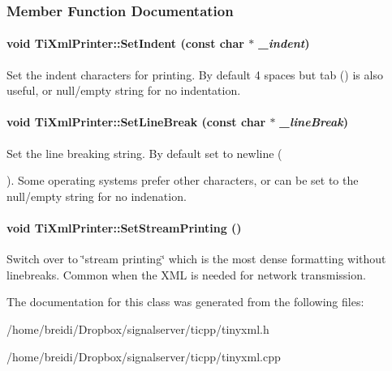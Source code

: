 \subsubsection{Member Function Documentation}
\hypertarget{class_ti_xml_printer_a213377a4070c7e625bae59716b089e5e}{
\paragraph[{SetIndent}]{\setlength{\rightskip}{0pt plus 5cm}void TiXmlPrinter::SetIndent (const char $\ast$ {\em \_\-indent})}\hfill}
\label{class_ti_xml_printer_a213377a4070c7e625bae59716b089e5e}
Set the indent characters for printing. By default 4 spaces but tab () is also useful, or null/empty string for no indentation. \hypertarget{class_ti_xml_printer_a4be1e37e69e3858c59635aa947174fe6}{
\paragraph[{SetLineBreak}]{\setlength{\rightskip}{0pt plus 5cm}void TiXmlPrinter::SetLineBreak (const char $\ast$ {\em \_\-lineBreak})}\hfill}
\label{class_ti_xml_printer_a4be1e37e69e3858c59635aa947174fe6}
Set the line breaking string. By default set to newline (\par
). Some operating systems prefer other characters, or can be set to the null/empty string for no indenation. \hypertarget{class_ti_xml_printer_ab23a90629e374cb1cadca090468bbd19}{
\paragraph[{SetStreamPrinting}]{\setlength{\rightskip}{0pt plus 5cm}void TiXmlPrinter::SetStreamPrinting ()}\hfill}
\label{class_ti_xml_printer_ab23a90629e374cb1cadca090468bbd19}
Switch over to \char`\"{}stream printing\char`\"{} which is the most dense formatting without linebreaks. Common when the XML is needed for network transmission. 

The documentation for this class was generated from the following files:\begin{DoxyCompactItemize}
\item 
/home/breidi/Dropbox/signalserver/ticpp/tinyxml.h\item 
/home/breidi/Dropbox/signalserver/ticpp/tinyxml.cpp\end{DoxyCompactItemize}
